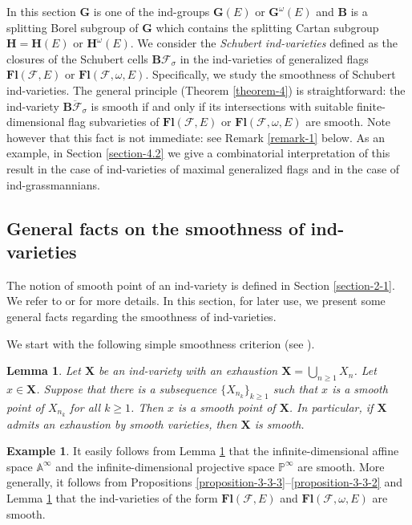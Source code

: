 \documentclass[12pt]{amsart}
\newtheorem{lemma}{Lemma}
\theoremstyle{definition}
\newtheorem{example}{Example}
\begin{document}
In this section $\mathbf{G}$ is one of the ind-groups $\mathbf{G}(E)$ or $\mathbf{G}^\omega(E)$
and $\mathbf{B}$ is a splitting Borel subgroup of $\mathbf{G}$ which contains the
splitting Cartan subgroup $\mathbf{H}=\mathbf{H}(E)$ or $\mathbf{H}^\omega(E)$.
We consider the {\em Schubert ind-varieties} defined as the closures of the Schubert cells
$\mathbf{B}\mathcal{F}_\sigma$ in the ind-varieties of generalized flags $\mathbf{Fl}(\mathcal{F},E)$ or
$\mathbf{Fl}(\mathcal{F},\omega,E)$.
Specifically, we study the smoothness of Schubert ind-varieties.
The general principle (Theorem \ref{theorem-4}) is straightforward: the ind-variety $\overline{\mathbf{B}\mathcal{F}_\sigma}$ is smooth if and only if its  intersections with suitable finite-dimensional flag subvarieties
of $\mathbf{Fl}(\mathcal{F},E)$ or
$\mathbf{Fl}(\mathcal{F},\omega,E)$ are smooth. Note however that this fact is not immediate: see Remark \ref{remark-1} below. As an example, in Section \ref{section-4.2} we give a combinatorial interpretation of this result in the case of ind-varieties of maximal generalized flags and in the case of ind-grassmannians.

\subsection{General facts on the smoothness of ind-varieties}

\label{section-6-1}

The notion of smooth point of an ind-variety is defined in Section \ref{section-2-1}.
We refer to \cite[Chapter 4]{K} or \cite{S} for more details.
In this section, for later use, we present some general facts regarding the smoothness of ind-varieties.

We start with the following simple smoothness criterion (see \cite{K}).

\begin{lemma}
\label{lemma-4} Let $\mathbf{X}$ be an ind-variety
with an exhaustion $\mathbf{X}=\bigcup_{n\geq 1}X_n$.
Let $x\in \mathbf{X}$.
Suppose that there is a subsequence $\{X_{n_k}\}_{k\geq 1}$ such that $x$  is a smooth point of $X_{n_k}$ for all $k\geq 1$.
Then $x$ is a smooth point of $\mathbf{X}$. In particular, if $\mathbf{X}$ admits an exhaustion by smooth varieties, then $\mathbf{X}$ is smooth.
\end{lemma}

\begin{example}
It easily follows from Lemma \ref{lemma-4} that the infinite-dimensional affine space
$\mathbb{A}^\infty$ and the infinite-dimensional projective space $\mathbb{P}^\infty$ are
smooth. More generally,
it follows from Propositions \ref{proposition-3-3-3}--\ref{proposition-3-3-2} and Lemma \ref{lemma-4} that
the ind-varieties of the form $\mathbf{Fl}(\mathcal{F},E)$ and $\mathbf{Fl}(\mathcal{F},\omega,E)$ are smooth.
\end{example}
\end{document}
